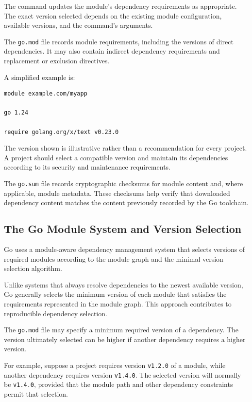 The command updates the module's dependency requirements as appropriate. The exact version selected depends on the existing module configuration, available versions, and the command's arguments.

The \texttt{go.mod} file records module requirements, including the versions of direct dependencies. It may also contain indirect dependency requirements and replacement or exclusion directives.

A simplified example is:

\begin{lstlisting}
module example.com/myapp

go 1.24

require golang.org/x/text v0.23.0
\end{lstlisting}

The version shown is illustrative rather than a recommendation for every project. A project should select a compatible version and maintain its dependencies according to its security and maintenance requirements.

The \texttt{go.sum} file records cryptographic checksums for module content and, where applicable, module metadata. These checksums help verify that downloaded dependency content matches the content previously recorded by the Go toolchain.

\subsection{The Go Module System and Version Selection}

Go uses a module-aware dependency management system that selects versions of required modules according to the module graph and the minimal version selection algorithm.

Unlike systems that always resolve dependencies to the newest available version, Go generally selects the minimum version of each module that satisfies the requirements represented in the module graph. This approach contributes to reproducible dependency selection.

The \texttt{go.mod} file may specify a minimum required version of a dependency. The version ultimately selected can be higher if another dependency requires a higher version.

For example, suppose a project requires version \texttt{v1.2.0} of a module, while another dependency requires version \texttt{v1.4.0}. The selected version will normally be \texttt{v1.4.0}, provided that the module path and other dependency constraints permit that selection.

